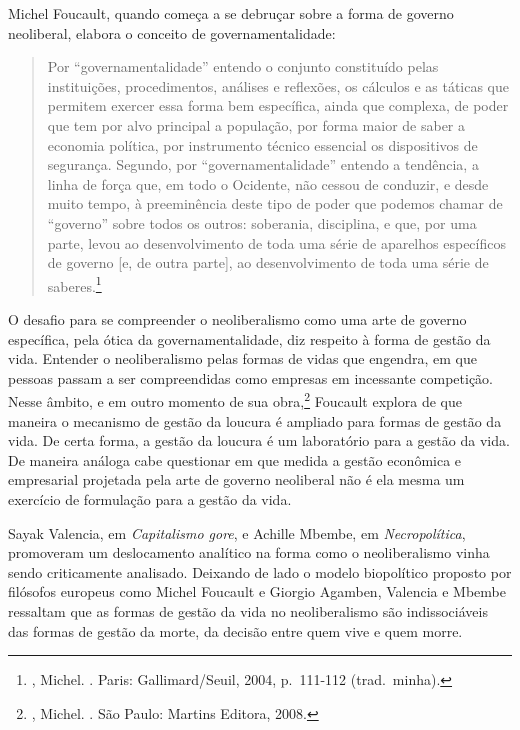 Michel Foucault, quando começa a se debruçar sobre a forma de governo
neoliberal, elabora o conceito de governamentalidade:

\begin{quote}
Por ``governamentalidade'' entendo o conjunto constituído pelas
instituições, procedimentos, análises e reﬂexões, os cálculos e as
táticas que permitem exercer essa forma bem especíﬁca, ainda que
complexa, de poder que tem por alvo principal a população, por forma
maior de saber a economia política, por instrumento técnico essencial os
dispositivos de segurança. Segundo, por ``governamentalidade'' entendo a
tendência, a linha de força que, em todo o Ocidente, não cessou de
conduzir, e desde muito tempo, à preeminência deste tipo de poder que
podemos chamar de ``governo'' sobre todos os outros: soberania,
disciplina, e que, por uma parte, levou ao desenvolvimento de toda uma
série de aparelhos especíﬁcos de governo {[}e, de outra parte{]}, ao
desenvolvimento de toda uma série de saberes.\footnote{,
  Michel. {}. Paris: Gallimard/Seuil, 2004, p.~111-112 (trad.~minha).}
\end{quote}

O desafio para se compreender o neoliberalismo como uma arte de governo
específica, pela ótica da governamentalidade, diz respeito à forma de
gestão da vida. Entender o neoliberalismo pelas formas de vidas que
engendra, em que pessoas passam a ser compreendidas como empresas em
incessante competição. Nesse âmbito, e em outro momento de sua
obra,\footnote{, Michel. {}. São Paulo: Martins Editora, 2008.}
Foucault explora de que maneira o mecanismo de gestão da loucura é
ampliado para formas de gestão da vida. De certa forma, a gestão da
loucura é um laboratório para a gestão da vida. De maneira análoga cabe
questionar em que medida a gestão econômica e empresarial projetada pela
arte de governo neoliberal não é ela mesma um exercício de formulação
para a gestão da vida.

Sayak Valencia, em \emph{Capitalismo gore}, e Achille Mbembe, em
\emph{Necropolítica}, promoveram um deslocamento analítico na forma como
o neoliberalismo vinha sendo criticamente analisado. Deixando de lado o
modelo biopolítico proposto por filósofos europeus como Michel Foucault
e Giorgio Agamben, Valencia e Mbembe ressaltam que as formas
de gestão da vida no neoliberalismo são indissociáveis das formas de
gestão da morte, da decisão entre quem vive e quem morre.

